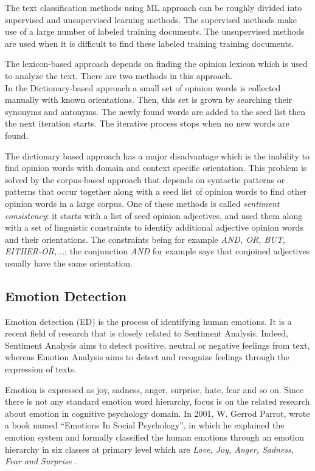The text classification methods using ML approach can be roughly divided into supervised and unsupervised learning methods. The supervised methods make use of a large number of labeled training documents. The unsupervised methods are used when it is difficult to find these labeled training training documents. \par
The lexicon-based approach depends on finding the opinion lexicon which is used to analyze the text. There are two methods in this approach.	\\ In the Dictionary-based approach a small set of opinion words is collected manually with known orientations. Then, this set is grown by searching their synonyms and antonyms. The newly found words are added to the seed list then the next iteration starts. The iterative process stops when no new words are found. \par
The dictionary based approach has a major disadvantage which is the inability to find opinion words with domain and context specific orientation. This problem is solved by the corpus-based approach that depends on syntactic patterns or patterns that occur together along with a seed list of opinion words to find other opinion words in a large corpus. One of these methods is called \textit{sentiment consistency}: it starts with a list of seed opinion adjectives, and used them along with a set of linguistic constraints to identify additional adjective opinion words and their orientations. The constraints being for example \textit{AND, OR, BUT, EITHER-OR,...}; the conjunction \textit{AND} for example says that conjoined adjectives usually have the same orientation. \par


\subsection{Emotion Detection}
Emotion detection (ED) is the process of identifying human emotions. It is a recent field of research that is closely related to Sentiment Analysis. Indeed, Sentiment Analysis aims to detect positive, neutral or negative feelings from text, whereas Emotion Analysis aims to detect and recognize feelings through the expression of texts.\par
Emotion is expressed as joy, sadness, anger, surprise, hate, fear and so on. Since there is not any standard emotion word hierarchy, focus is on the related research about emotion in cognitive psychology domain. In 2001, W. Gerrod Parrot, wrote a book named ``Emotions In Social Psychology'', in which he explained the emotion system and formally classified the human emotions through an emotion hierarchy in six classes at primary level which are \textit{Love, Joy, Anger, Sadness, Fear and Surprise} \cite{edfromtext}.\par

